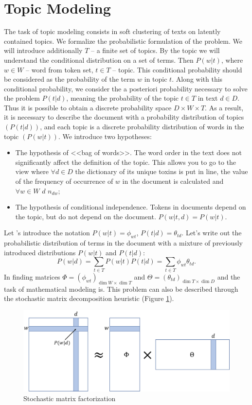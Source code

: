 \documentclass[12pt]{report}
\begin{document}
\section{Topic Modeling}
The task of topic modeling consists in soft clustering of texts on latently contained topics. We formalize the probabilistic formulation of the problem. We will introduce additionally
 $T$ -- a finite set of topics. By the topic we will understand the conditional distribution on a set of terms. Then $P(w|t)$, where $w \in W$ -- word from token set, $t \in T$ -- topic. This conditional probability should be considered as the probability of the term $w$ in topic $t$. Along with this conditional probability, we consider the a posteriori probability necessary to solve the problem $P(t|d)$, meaning the probability of the topic $t\in T$ in text $d \in D$. Thus it is possible to obtain a discrete probability space $D \times W \times T$. As a result, it is necessary to describe the document with a probability distribution of topics $(P(t|d))$, and each topic is a discrete probability distribution of words in the topic $(P(w|t))$. We introduce two hypotheses:
\begin{itemize}
    \item The hypothesis of <<bag of words>>. The word order in the text does not significantly affect the definition of the topic. This allows you to go to the view where $\forall d \in D$  the dictionary of its unique toxins is put in line, the value of the frequency of occurrence of $w$ in the document is calculated and $\forall w \in W$  $d$ $n_{dw}$;
    \item The hypothesis of conditional independence. Tokens in documents depend on the topic, but do not depend on the document. $P(w|t,d) = P(w|t)$.
\end{itemize}
Let 's introduce the notation $P(w|t) = \phi_{wt}$, $P(t|d) = \theta_{td}$. Let's write out the probabilistic distribution of terms in the document with a mixture of previously introduced distributions $P(w|t)$ and $P(t|d)$:
\[P(w|d) = \sum \limits_{t\in T} P(w|t)P(t|d) = \sum\limits_{t\in T} \phi_{wt}\theta_{td}.\]
In finding matrices $\Phi = \left(\phi_{wt}\right)_{\dim{W}\times \dim{T}}$ and $\Theta = \left(\theta_{td}\right)_{\dim{T} \times \dim{D}}$ and the task of mathematical modeling is. This problem can also be described through the stochastic matrix decomposition heuristic (Figure \ref{fig:svd}).
\begin{figure}[H]
    \centering
    \includegraphics[scale=0.5]{./svd.png}
    \caption{Stochastic matrix factorization}
    \label{fig:svd}
\end{figure}
\end{document}
